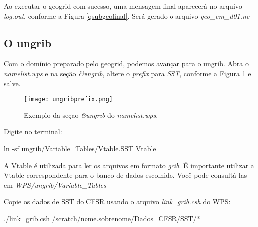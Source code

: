 \noindent Ao executar o geogrid com sucesso, uma mensagem final aparecerá no arquivo \textit{log.out}, conforme a Figura \textcolor{bleu_cite}{\ref{qsubgeofinal}}. Será gerado o arquivo \textit{geo\_em\_d01.nc}
\bigskip


\subsection{O ungrib}
\bigskip
\noindent Com o domínio preparado pelo geogrid, podemos avançar para o ungrib. Abra o \textit{namelist.wps} e na seção \textit{\&ungrib}, altere o \textit{prefix} para \textit{SST}, conforme a Figura \ref{ungribprefix} e salve.
\bigskip

\begin{figure}[H]
    \centering
    \texttt{[image: ungribprefix.png]}
    \caption{Exemplo da seção \textit{\&ungrib} do \textit{namelist.wps}.}
    \label{ungribprefix}
\end{figure}
\bigskip

\noindent Digite no terminal:
\bigskip

\begin{bashcode}
ln -sf ungrib/Variable_Tables/Vtable.SST Vtable
\end{bashcode}
\bigskip

\begin{tcolorbox}[enhanced,
  grow to left by=0cm,%
  grow to right by=0cm,%
  enlarge top by=0cm,%
  enlarge bottom by=0cm,%
  tcbox raise base,
  boxrule=1.0pt,
  left=18mm,
  colframe=red!50!black,coltext=red!25!black,colback=red!10!white,
  overlay={\begin{tcbclipinterior}\fill[red!75!blue!50!white] (frame.south west)
    rectangle node[text=white,font=\sffamily\bfseries\footnotesize,rotate=0] {ATENÇÃO} ([xshift=18mm]frame.north west);\end{tcbclipinterior}}]
A Vtable é utilizada para ler os arquivos em formato \textit{grib}. É importante utilizar a Vtable correspondente para o banco de dados escolhido. Você pode consultá-las em \textit{WPS/ungrib/Variable\_Tables}
\end{tcolorbox}
\bigskip

\noindent Copie os dados de SST do CFSR usando o arquivo \textit{link\_grib.csh} do WPS:
\bigskip

\begin{bashcode}
./link_grib.csh /scratch/nome.sobrenome/Dados_CFSR/SST/*
\end{bashcode}
\bigskip

